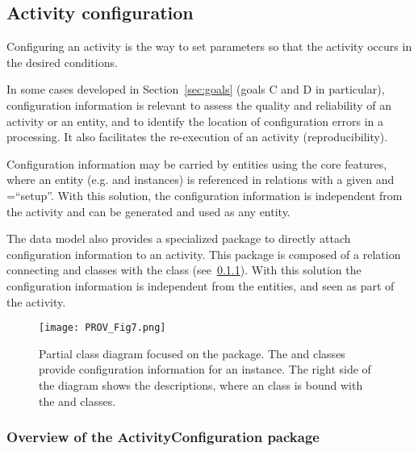 \subsection{Activity configuration}
\label{sec:configuration}

Configuring an activity is the way to set parameters so that the activity occurs in the desired conditions.

In some cases developed in Section~\ref{sec:goals} (goals C and D in particular), configuration information is relevant to assess the quality and reliability of an activity or an entity, and to identify the location of configuration errors in a processing. It also facilitates the re-execution of an activity (reproducibility).

Configuration information may be carried by entities using the core features, where an entity (e.g.  and  instances) is referenced in  relations with a given  and =“setup”. With this solution, the configuration information is independent from the activity and can be generated and used as any entity.

The data model also provides a specialized  package to directly attach configuration information to an activity. This package is composed of a  relation connecting   and  classes with the  class (see~\ref{sec:configurationpackage}). With this solution the configuration information is independent from the entities, and seen as part of the activity.


\begin{figure}[hbt]
\centering
\texttt{[image: PROV\_Fig7.png]}
\caption[Partial class diagram focused on the  package.]{Partial class diagram focused on the  package. The  and  classes provide configuration information for an  instance. The right side of the diagram shows the descriptions, where an  class is bound with the  and  classes.}
\label{fig:activityconfig}
\end{figure}


\subsubsection{Overview of the ActivityConfiguration package} \label{sec:configurationpackage}

